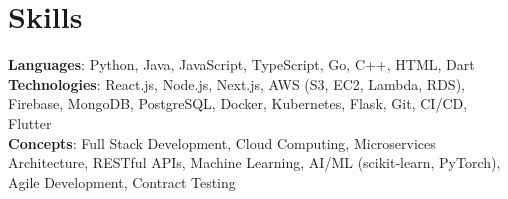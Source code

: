 \documentclass[letterpaper,11pt]{article}
\begin{document}
\section{Skills}
 \begin{itemize}[leftmargin=0.15in, label={}]
    \small{\item{
     \textbf{Languages}{: Python, Java, JavaScript, TypeScript, Go, C++, HTML, Dart} \\
     \textbf{Technologies}{: React.js, Node.js, Next.js, AWS (S3, EC2, Lambda, RDS), Firebase, MongoDB, PostgreSQL, Docker, Kubernetes, Flask, Git, CI/CD, Flutter} \\
     \textbf{Concepts}{: Full Stack Development, Cloud Computing, Microservices Architecture, RESTful APIs, Machine Learning, AI/ML (scikit-learn, PyTorch), Agile Development, Contract Testing} }}
 \end{itemize}
 
%
\end{document}
